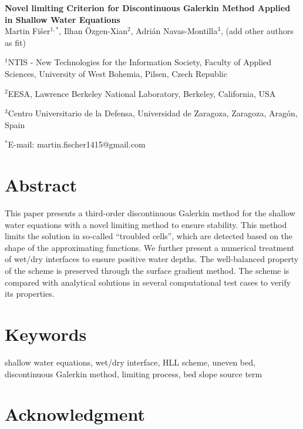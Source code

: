 \documentclass[12pt]{article}
\date{}
\begin{document}
\begin{flushleft}
{\Large
\textbf{Novel limiting Criterion for Discontinuous Galerkin Method Applied in Shallow Water Equations}
}
\\

Martin Fi\v{s}er$^{1,\ast}$, Ilhan \"Ozgen-Xian$^2$, Adri\'an
Navas-Montilla$^3$, (add other authors as fit)


$^1$NTIS - New Technologies for the Information Society, Faculty of
Applied Sciences, University of West Bohemia, Pilsen, Czech Republic

$^2$EESA, Lawrence Berkeley National Laboratory, Berkeley, California,
USA

$^3$Centro Universitario de la Defensa, Universidad de Zaragoza,
Zaragoza, Arag\'on, Spain

$^\ast$E-mail: martin.fischer1415@gmail.com
\end{flushleft}


\section*{Abstract} 

This paper presents a third-order discontinuous Galerkin method for
the shallow water equations with a novel limiting method to ensure
stability.  This method limits the solution in so-called ``troubled
cells'', which are detected based on the shape of the approximating
functions.  We further present a numerical treatment of wet/dry
interfaces to ensure positive water depths.  The well-balanced
property of the scheme is preserved through the surface gradient
method.  The scheme is compared with analytical solutions in several
computational test cases to verify its properties.

\section*{Keywords}

shallow water equations, wet/dry interface, HLL scheme, uneven bed,
discontinuous Galerkin method, limiting process, bed slope source term






%


\section*{Acknowledgment}


{}
\end{document}
